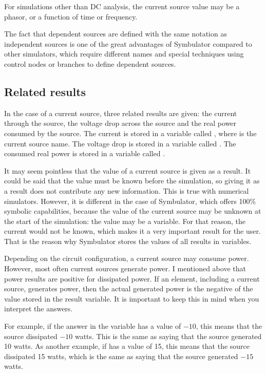 For simulations other than DC analysis, the current source value may
be a phasor, or a function of time or frequency.

The fact that dependent sources are defined with the same notation
as independent sources is one of the great advantages of Symbulator
compared to other simulators, which require different names and
special techniques using control nodes or branches to define
dependent sources.

\subsection{Related results}

In the case of a current source, three related results are given:
the current through the source, the voltage drop across the source
and the real power consumed by the source. The current is stored in
a variable called , where  is the current
source name. The voltage drop is stored in a variable called
. The consumed real power is stored in a variable called
.

It may seem pointless that the value of a current source is given as
a result. It could be said that the value must be known before the
simulation, so giving it as a result does not contribute any new
information. This is true with numerical simulators. However, it is
different in the case of Symbulator, which offers 100\% symbolic
capabilities, because the value of the current source may be unknown
at the start of the simulation: the value may be a variable. For
that reason, the current would not be known, which makes it a very
important result for the user. That is the reason why Symbulator
stores the values of all results in variables.

Depending on the circuit configuration, a current source may consume
power. However, most often current sources generate power. I
mentioned above that power results are positive for dissipated
power. If an element, including a current source, generates power,
then the actual generated power is the negative of the value stored
in the result variable. It is important to keep this in mind when
you interpret the answers.

For example, if the answer in the variable  has a value
of $-10$, this means that the source dissipated $-10$ watts. This is
the same as saying that the source generated 10 watts. As another
example, if  has a value of 15, this means that the
source dissipated 15 watts, which is the same as saying that the
source generated $-15$ watts.

